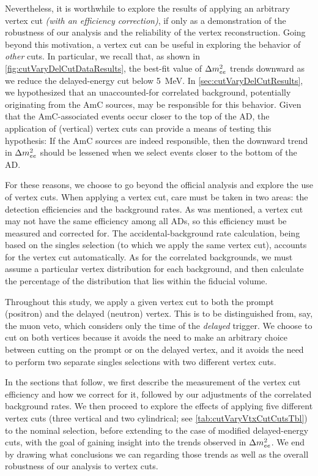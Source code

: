 \documentclass[../thesis.tex]{subfiles}
\begin{document}
Nevertheless, it is worthwhile to explore the results of applying an arbitrary vertex cut \emph{(with an efficiency correction)}, if only as a demonstration of the robustness of our analysis and the reliability of the vertex reconstruction. Going beyond this motivation, a vertex cut can be useful in exploring the behavior of \emph{other} cuts. In particular, we recall that, as shown in \autoref{fig:cutVaryDelCutDataResults}, the best-fit value of $\Delta m^2_{ee}$ trends downward as we reduce the delayed-energy cut below 5~MeV. In \autoref{sec:cutVaryDelCutResults}, we hypothesized that an unaccounted-for correlated background, potentially originating from the AmC sources, may be responsible for this behavior. Given that the AmC-associated events occur closer to the top of the AD, the application of (vertical) vertex cuts can provide a means of testing this hypothesis: If the AmC sources are indeed responsible, then the downward trend in $\Delta m^2_{ee}$ should be lessened when we select events closer to the bottom of the AD\@.

For these reasons, we choose to go beyond the official analysis and explore the use of vertex cuts. When applying a vertex cut, care must be taken in two areas: the detection efficiencies and the background rates. As was mentioned, a vertex cut may not have the same efficiency among all ADs, so this efficiency must be measured and corrected for. The accidental-background rate calculation, being based on the singles selection (to which we apply the same vertex cut), accounts for the vertex cut automatically. As for the correlated backgrounds, we must assume a particular vertex distribution for each background, and then calculate the percentage of the distribution that lies within the fiducial volume.

Throughout this study, we apply a given vertex cut to both the prompt (positron) and the delayed (neutron) vertex. This is to be distinguished from, say, the muon veto, which considers only the time of the \emph{delayed} trigger. We choose to cut on both vertices because it avoids the need to make an arbitrary choice between cutting on the prompt or on the delayed vertex, and it avoids the need to perform two separate singles selections with two different vertex cuts.

In the sections that follow, we first describe the measurement of the vertex cut efficiency and how we correct for it, followed by our adjustments of the correlated background rates. We then proceed to explore the effects of applying five different vertex cuts (three vertical and two cylindrical; see \autoref{tab:cutVaryVtxCutCutsTbl}) to the nominal selection, before extending to the case of modified delayed-energy cuts, with the goal of gaining insight into the trends observed in $\Delta m^2_{ee}$. We end by drawing what conclusions we can regarding those trends as well as the overall robustness of our analysis to vertex cuts.
\end{document}
